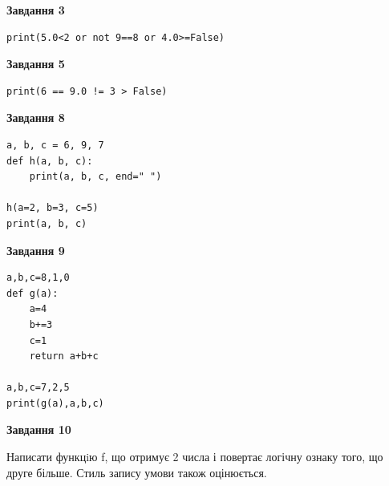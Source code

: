 \documentclass[12pt, ukrainian]{article}
\begin{document}
{\begin {large}
\begin{minipage}[t]{7.5cm}
\end{minipage}
\vline \hspace{6mm}
\begin{minipage}[t]{10.5cm}

\begin{center}
\textbf{Завдання 3}
\end{center}

\begin{verbatim}
print(5.0<2 or not 9==8 or 4.0>=False)
\end{verbatim}



\begin{center}
\textbf{Завдання 5}
\end{center}

\begin{verbatim}
print(6 == 9.0 != 3 > False)
\end{verbatim}



\begin{center}
\textbf{Завдання 8}
\end{center}

\begin{verbatim}
a, b, c = 6, 9, 7
def h(a, b, c):
    print(a, b, c, end=" ")

h(a=2, b=3, c=5)
print(a, b, c)
\end{verbatim}



\begin{center}
\textbf{Завдання 9}
\end{center}

\begin{verbatim}
a,b,c=8,1,0
def g(a):
    a=4
    b+=3
    c=1
    return a+b+c

a,b,c=7,2,5
print(g(a),a,b,c)
\end{verbatim}



\begin{center}
\textbf{Завдання 10}
\end{center}

Написати функцiю f, що отримує 2 числа і повертає логічну ознаку того, що друге більше. Стиль запису умови також оцінюється.\par

\end{minipage}

\end {large}}
\newpage
\end{document}
